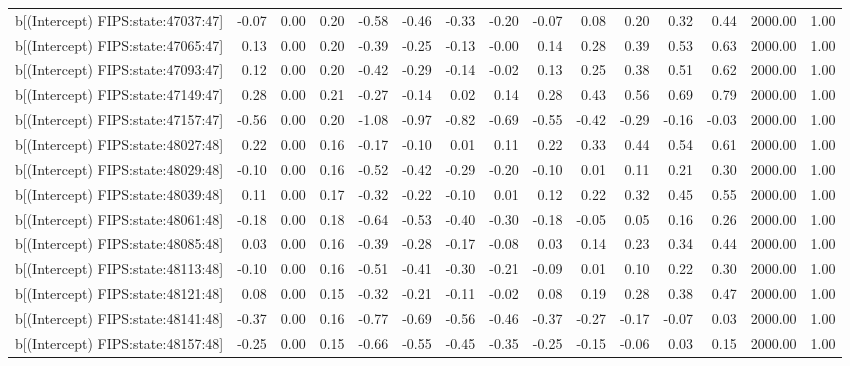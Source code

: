 \begin{table}[ht]
\begin{tabular}{rrrrrrrrrrrrrrr}
  b[(Intercept) FIPS:state:47037:47] & -0.07 & 0.00 & 0.20 & -0.58 & -0.46 & -0.33 & -0.20 & -0.07 & 0.08 & 0.20 & 0.32 & 0.44 & 2000.00 & 1.00 \\ 
  b[(Intercept) FIPS:state:47065:47] & 0.13 & 0.00 & 0.20 & -0.39 & -0.25 & -0.13 & -0.00 & 0.14 & 0.28 & 0.39 & 0.53 & 0.63 & 2000.00 & 1.00 \\ 
  b[(Intercept) FIPS:state:47093:47] & 0.12 & 0.00 & 0.20 & -0.42 & -0.29 & -0.14 & -0.02 & 0.13 & 0.25 & 0.38 & 0.51 & 0.62 & 2000.00 & 1.00 \\ 
  b[(Intercept) FIPS:state:47149:47] & 0.28 & 0.00 & 0.21 & -0.27 & -0.14 & 0.02 & 0.14 & 0.28 & 0.43 & 0.56 & 0.69 & 0.79 & 2000.00 & 1.00 \\ 
  b[(Intercept) FIPS:state:47157:47] & -0.56 & 0.00 & 0.20 & -1.08 & -0.97 & -0.82 & -0.69 & -0.55 & -0.42 & -0.29 & -0.16 & -0.03 & 2000.00 & 1.00 \\ 
  b[(Intercept) FIPS:state:48027:48] & 0.22 & 0.00 & 0.16 & -0.17 & -0.10 & 0.01 & 0.11 & 0.22 & 0.33 & 0.44 & 0.54 & 0.61 & 2000.00 & 1.00 \\ 
  b[(Intercept) FIPS:state:48029:48] & -0.10 & 0.00 & 0.16 & -0.52 & -0.42 & -0.29 & -0.20 & -0.10 & 0.01 & 0.11 & 0.21 & 0.30 & 2000.00 & 1.00 \\ 
  b[(Intercept) FIPS:state:48039:48] & 0.11 & 0.00 & 0.17 & -0.32 & -0.22 & -0.10 & 0.01 & 0.12 & 0.22 & 0.32 & 0.45 & 0.55 & 2000.00 & 1.00 \\ 
  b[(Intercept) FIPS:state:48061:48] & -0.18 & 0.00 & 0.18 & -0.64 & -0.53 & -0.40 & -0.30 & -0.18 & -0.05 & 0.05 & 0.16 & 0.26 & 2000.00 & 1.00 \\ 
  b[(Intercept) FIPS:state:48085:48] & 0.03 & 0.00 & 0.16 & -0.39 & -0.28 & -0.17 & -0.08 & 0.03 & 0.14 & 0.23 & 0.34 & 0.44 & 2000.00 & 1.00 \\ 
  b[(Intercept) FIPS:state:48113:48] & -0.10 & 0.00 & 0.16 & -0.51 & -0.41 & -0.30 & -0.21 & -0.09 & 0.01 & 0.10 & 0.22 & 0.30 & 2000.00 & 1.00 \\ 
  b[(Intercept) FIPS:state:48121:48] & 0.08 & 0.00 & 0.15 & -0.32 & -0.21 & -0.11 & -0.02 & 0.08 & 0.19 & 0.28 & 0.38 & 0.47 & 2000.00 & 1.00 \\ 
  b[(Intercept) FIPS:state:48141:48] & -0.37 & 0.00 & 0.16 & -0.77 & -0.69 & -0.56 & -0.46 & -0.37 & -0.27 & -0.17 & -0.07 & 0.03 & 2000.00 & 1.00 \\ 
  b[(Intercept) FIPS:state:48157:48] & -0.25 & 0.00 & 0.15 & -0.66 & -0.55 & -0.45 & -0.35 & -0.25 & -0.15 & -0.06 & 0.03 & 0.15 & 2000.00 & 1.00 \\ 

\end{tabular}
\end{table}
